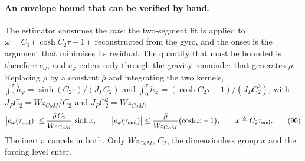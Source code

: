 \documentclass[10pt]{article}
\newcommand{\Wz}{W\!z_{CoM}}
\begin{document}
\paragraph{An envelope bound that can be verified by hand.}
The estimator consumes the \emph{rate}: the two-segment fit is applied
to $\omega = C_1(\cosh C_2\tau - 1)$ reconstructed from the gyro, and
the onset is the argument that minimises its residual. The quantity
that must be bounded is therefore $e_\omega$, and $e_\varphi$ enters
only through the gravity remainder that generates $\rho$. Replacing
$\rho$ by a constant $\bar\rho$ and integrating the two kernels,
$\int_0^\tau \dot h_\varphi = \sinh(C_2\tau)/(J_PC_2)$ and
$\int_0^\tau h_\varphi = (\cosh C_2\tau - 1)/(J_PC_2^2)$, with
$J_PC_2 = \Wz/C_2$ and $J_PC_2^2 = \Wz$,
\begin{equation}
  \bigl|e_\omega(\tau_{\rm end})\bigr| \le
  \frac{\bar\rho\,C_2}{\Wz}\,\sinh x ,
  \qquad
  \bigl|e_\varphi(\tau_{\rm end})\bigr| \le
  \frac{\bar\rho}{\Wz}\bigl(\cosh x - 1\bigr),
  \qquad x \triangleq C_2\tau_{\rm end}.
  \tag{90}
\end{equation}
The inertia cancels in both.  Only $\Wz$, $C_2$, the dimensionless
group $x$ and the forcing level enter.
\end{document}
